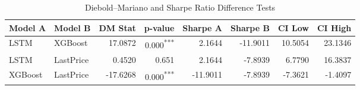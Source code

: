 \begin{table}[H]
\centering
\caption{Diebold--Mariano and Sharpe Ratio Difference Tests}
\begin{tabular}{l l r r r r r r}
\hline
Model A & Model B & DM Stat & p-value & Sharpe A & Sharpe B & CI Low & CI High \\
\hline
LSTM & XGBoost & 17.0872 & 0.000\textsuperscript{***} & 2.1644 & -11.9011 & 10.5054 & 23.1346 \\
LSTM & LastPrice & 0.4520 & 0.651 & 2.1644 & -7.8939 & 6.7790 & 16.3837 \\
XGBoost & LastPrice & -17.6268 & 0.000\textsuperscript{***} & -11.9011 & -7.8939 & -7.3621 & -1.4097 \\
\hline
\end{tabular}
\label{tab:dm_sharpe_results}
\end{table}
